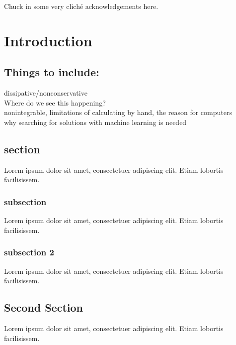 \documentclass[a4paper,12pt]{report}
\begin{document}
Chuck in some very cliché acknowledgements here.












\chapter{Introduction}
\section{Things to include:}
dissipative/nonconservative\\
Where do we see this happening?\cite{Ref2}\\
nonintegrable, limitations of calculating by hand, the reason for computers\\
why searching for solutions with machine learning is needed\\
\cite[pp.~215]{RefExample} 

\section{section}
Lorem ipsum dolor sit amet, consectetuer adipiscing elit.  
Etiam lobortis facilisissem.  
\subsection{subsection}
Lorem ipsum dolor sit amet, consectetuer adipiscing elit.  
Etiam lobortis facilisissem.  
\subsection{subsection 2}
Lorem ipsum dolor sit amet, consectetuer adipiscing elit.  
Etiam lobortis facilisissem.  

\section{Second Section}
 
Lorem ipsum dolor sit amet, consectetuer adipiscing elit.  
Etiam lobortis facilisissem.  
\end{document}

